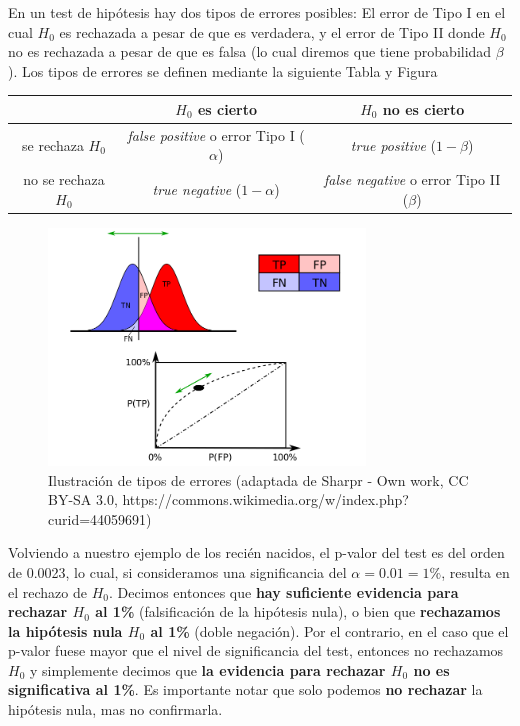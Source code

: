 En un test de hipótesis hay dos tipos de errores posibles: El error de Tipo I en el cual $H_0$ es rechazada a pesar de que es verdadera, y el error de Tipo II donde $H_0$ no es rechazada a pesar de que es falsa (lo cual diremos que tiene probabilidad $\beta$). Los tipos de errores se definen mediante la siguiente Tabla y Figura 

\vspace{1em}
\begin{center}
	\begin{tabular}{c|cc}
			  & $H_0$ es cierto & $H_0$ no es cierto  \\
			\hline
			se rechaza $H_0$  & \emph{false positive} o error Tipo I ($\alpha$) & \emph{true positive} ($1-\beta$)    \\
			no se rechaza $H_0$  & \emph{true negative} ($1-\alpha$) & \emph{false negative} o error Tipo II ($\beta$)
	\end{tabular}
\end{center}

\begin{figure}[h]
    \centering
    \includegraphics[trim = {0 300pt 0 0}, clip, width=0.75\textwidth]{img/ROC_curves.svg.png}
    \caption{Ilustración de tipos de errores (adaptada de Sharpr - Own work, CC BY-SA 3.0, https://commons.wikimedia.org/w/index.php?curid=44059691)}
    \label{fig:tipos_de_errore_TDH}
\end{figure}

Volviendo a nuestro ejemplo de los recién nacidos, el p-valor del test es del orden de 0.0023, lo cual, si consideramos una significancia del $\alpha=0.01=1\%$, resulta en el rechazo de $H_0$. Decimos entonces que \textbf{ hay suficiente evidencia para rechazar $H_0$ al 1\%}  (falsificación de la hipótesis nula), o bien que \textbf{ rechazamos la hipótesis nula $H_0$ al 1\%} (doble negación). Por el contrario, en el caso que el p-valor fuese mayor que el nivel de significancia del test, entonces no rechazamos $H_0$ y simplemente decimos que \textbf{ la evidencia para rechazar $H_0$ no es significativa al 1\%}. Es importante notar que solo podemos \textbf{no rechazar} la hipótesis nula, mas no confirmarla.


